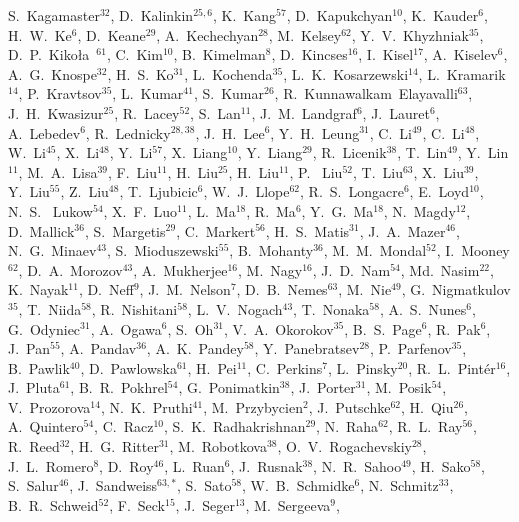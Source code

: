 {S.~Kagamaster$^{32}$,
D.~Kalinkin$^{25,6}$,
K.~Kang$^{57}$,
D.~Kapukchyan$^{10}$,
K.~Kauder$^{6}$,
H.~W.~Ke$^{6}$,
D.~Keane$^{29}$,
A.~Kechechyan$^{28}$,
M.~Kelsey$^{62}$,
Y.~V.~Khyzhniak$^{35}$,
D.~P.~Kiko\l{}a~$^{61}$,
C.~Kim$^{10}$,
B.~Kimelman$^{8}$,
D.~Kincses$^{16}$,
I.~Kisel$^{17}$,
A.~Kiselev$^{6}$,
A.~G.~Knospe$^{32}$,
H.~S.~Ko$^{31}$,
L.~Kochenda$^{35}$,
L.~K.~Kosarzewski$^{14}$,
L.~Kramarik$^{14}$,
P.~Kravtsov$^{35}$,
L.~Kumar$^{41}$,
S.~Kumar$^{26}$,
R.~Kunnawalkam~Elayavalli$^{63}$,
J.~H.~Kwasizur$^{25}$,
R.~Lacey$^{52}$,
S.~Lan$^{11}$,
J.~M.~Landgraf$^{6}$,
J.~Lauret$^{6}$,
A.~Lebedev$^{6}$,
R.~Lednicky$^{28,38}$,
J.~H.~Lee$^{6}$,
Y.~H.~Leung$^{31}$,
C.~Li$^{49}$,
C.~Li$^{48}$,
W.~Li$^{45}$,
X.~Li$^{48}$,
Y.~Li$^{57}$,
X.~Liang$^{10}$,
Y.~Liang$^{29}$,
R.~Licenik$^{38}$,
T.~Lin$^{49}$,
Y.~Lin$^{11}$,
M.~A.~Lisa$^{39}$,
F.~Liu$^{11}$,
H.~Liu$^{25}$,
H.~Liu$^{11}$,
P.~ Liu$^{52}$,
T.~Liu$^{63}$,
X.~Liu$^{39}$,
Y.~Liu$^{55}$,
Z.~Liu$^{48}$,
T.~Ljubicic$^{6}$,
W.~J.~Llope$^{62}$,
R.~S.~Longacre$^{6}$,
E.~Loyd$^{10}$,
N.~S.~ Lukow$^{54}$,
X.~F.~Luo$^{11}$,
L.~Ma$^{18}$,
R.~Ma$^{6}$,
Y.~G.~Ma$^{18}$,
N.~Magdy$^{12}$,
D.~Mallick$^{36}$,
S.~Margetis$^{29}$,
C.~Markert$^{56}$,
H.~S.~Matis$^{31}$,
J.~A.~Mazer$^{46}$,
N.~G.~Minaev$^{43}$,
S.~Mioduszewski$^{55}$,
B.~Mohanty$^{36}$,
M.~M.~Mondal$^{52}$,
I.~Mooney$^{62}$,
D.~A.~Morozov$^{43}$,
A.~Mukherjee$^{16}$,
M.~Nagy$^{16}$,
J.~D.~Nam$^{54}$,
Md.~Nasim$^{22}$,
K.~Nayak$^{11}$,
D.~Neff$^{9}$,
J.~M.~Nelson$^{7}$,
D.~B.~Nemes$^{63}$,
M.~Nie$^{49}$,
G.~Nigmatkulov$^{35}$,
T.~Niida$^{58}$,
R.~Nishitani$^{58}$,
L.~V.~Nogach$^{43}$,
T.~Nonaka$^{58}$,
A.~S.~Nunes$^{6}$,
G.~Odyniec$^{31}$,
A.~Ogawa$^{6}$,
S.~Oh$^{31}$,
V.~A.~Okorokov$^{35}$,
B.~S.~Page$^{6}$,
R.~Pak$^{6}$,
J.~Pan$^{55}$,
A.~Pandav$^{36}$,
A.~K.~Pandey$^{58}$,
Y.~Panebratsev$^{28}$,
P.~Parfenov$^{35}$,
B.~Pawlik$^{40}$,
D.~Pawlowska$^{61}$,
H.~Pei$^{11}$,
C.~Perkins$^{7}$,
L.~Pinsky$^{20}$,
R.~L.~Pint\'{e}r$^{16}$,
J.~Pluta$^{61}$,
B.~R.~Pokhrel$^{54}$,
G.~Ponimatkin$^{38}$,
J.~Porter$^{31}$,
M.~Posik$^{54}$,
V.~Prozorova$^{14}$,
N.~K.~Pruthi$^{41}$,
M.~Przybycien$^{2}$,
J.~Putschke$^{62}$,
H.~Qiu$^{26}$,
A.~Quintero$^{54}$,
C.~Racz$^{10}$,
S.~K.~Radhakrishnan$^{29}$,
N.~Raha$^{62}$,
R.~L.~Ray$^{56}$,
R.~Reed$^{32}$,
H.~G.~Ritter$^{31}$,
M.~Robotkova$^{38}$,
O.~V.~Rogachevskiy$^{28}$,
J.~L.~Romero$^{8}$,
D.~Roy$^{46}$,
L.~Ruan$^{6}$,
J.~Rusnak$^{38}$,
N.~R.~Sahoo$^{49}$,
H.~Sako$^{58}$,
S.~Salur$^{46}$,
J.~Sandweiss$^{63,*}$,
S.~Sato$^{58}$,
W.~B.~Schmidke$^{6}$,
N.~Schmitz$^{33}$,
B.~R.~Schweid$^{52}$,
F.~Seck$^{15}$,
J.~Seger$^{13}$,
M.~Sergeeva$^{9}$,
}
